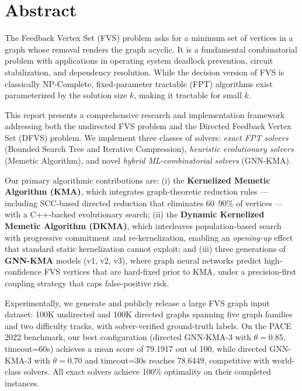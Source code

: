 \documentclass[10pt,a4paper]{report}
\theoremstyle{definition}
\newcommand{\fvs}{\textsc{FVS}}
\newcommand{\dfvs}{\textsc{DFVS}}
\begin{document}
\chapter*{Abstract}

The Feedback Vertex Set (\fvs{}) problem asks for a minimum set of vertices in a graph whose removal renders the graph acyclic.
It is a fundamental combinatorial problem with applications in operating system deadlock prevention, circuit stabilization, and dependency resolution.
While the decision version of \fvs{} is classically NP-Complete, fixed-parameter tractable (FPT) algorithms exist parameterized by the solution size $k$, making it tractable for small $k$.

This report presents a comprehensive research and implementation framework addressing both the undirected \fvs{} problem and the Directed Feedback Vertex Set (\dfvs{}) problem.
We implement three classes of solvers: \emph{exact FPT solvers} (Bounded Search Tree and Iterative Compression), \emph{heuristic evolutionary solvers} (Memetic Algorithm), and novel \emph{hybrid ML-combinatorial solvers} (GNN-KMA).

Our primary algorithmic contributions are: (i) the \textbf{Kernelized Memetic Algorithm (KMA)}, which integrates graph-theoretic reduction rules --- including SCC-based directed reduction that eliminates 60--90\% of vertices --- with a C++-backed evolutionary search; (ii) the \textbf{Dynamic Kernelized Memetic Algorithm (DKMA)}, which interleaves population-based search with progressive commitment and re-kernelization, enabling an \emph{opening-up} effect that standard static kernelization cannot exploit; and (iii) three generations of \textbf{GNN-KMA} models (v1, v2, v3), where graph neural networks predict high-confidence \fvs{} vertices that are hard-fixed prior to KMA, under a precision-first coupling strategy that caps false-positive risk.

Experimentally, we generate and publicly release a large \fvs{} graph input dataset: 100K undirected and 100K directed graphs spanning five graph families and two difficulty tracks, with solver-verified ground-truth labels. On the PACE 2022 benchmark, our best configuration (directed GNN-KMA-3 with $\theta = 0.85$, timeout=60s) achieves a mean score of 79.1917 out of 100, while directed GNN-KMA-3 with $\theta = 0.70$ and timeout=30s reaches 78.6449, competitive with world-class solvers. All exact solvers achieve 100\% optimality on their completed instances.
\end{document}
